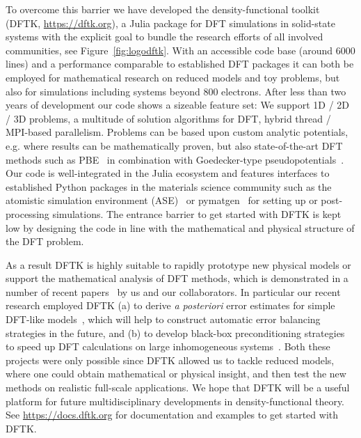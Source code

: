 \documentclass{juliacon}
\begin{document}
To overcome this barrier we have developed
the density-functional toolkit (DFTK, \url{https://dftk.org}),
a Julia package for DFT simulations in solid-state systems
with the explicit goal to bundle the research efforts of all involved communities,
see Figure~\ref{fig:logodftk}.
With an accessible code base (around 6000 lines)
and a performance comparable to established DFT packages
it can both be employed for mathematical research
on reduced models and toy problems,
but also for simulations including systems beyond 800 electrons.
After less than two years of development our code
shows a sizeable feature set:
We support 1D / 2D / 3D problems, a multitude of solution algorithms for DFT,
hybrid thread / MPI-based parallelism.
Problems can be based upon custom analytic potentials,
e.g. where results can be mathematically proven,
but also state-of-the-art DFT methods such as PBE~\cite{Perdew1996} in combination with
Goedecker-type pseudopotentials~\cite{Goedecker1996}.
Our code is well-integrated in the Julia ecosystem
and features interfaces to established Python packages
in the materials science community
such as the atomistic simulation environment (ASE)~\cite{HjorthLarsen2017} or
pymatgen~\cite{Ong2013} for setting up or post-processing simulations.
The entrance barrier to get started with DFTK
is kept low by designing the code in line with the mathematical and physical structure
of the DFT problem.
\vskip 6pt

As a result DFTK is highly suitable to rapidly prototype
new physical models or support the mathematical analysis of DFT methods,
which is demonstrated in a number
of recent papers~\cite{scfanalysis,garrigue2021building,scfprecondition,scferror}
by us and our collaborators.
In particular our recent research employed DFTK
(a) to derive \textit{a posteriori} error estimates for simple DFT-like models~\cite{scferror},
which will help to construct automatic error balancing strategies in the future,
and (b) to develop black-box preconditioning strategies
to speed up DFT calculations on large inhomogeneous systems~\cite{scfprecondition}.
Both these projects were only possible since DFTK allowed us to tackle
reduced models, where one could obtain mathematical or physical insight,
and then test the new methods on realistic full-scale applications.
We hope that DFTK will be a useful platform
for future multidisciplinary developments in density-functional theory.
See \url{https://docs.dftk.org} for documentation and examples to get started with DFTK.
\vskip 6pt
\end{document}
